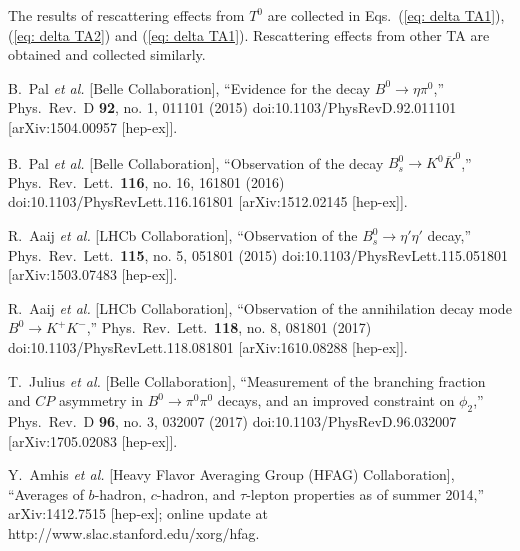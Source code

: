 \documentclass[aps,preprint,floats,epsf,epsfig,nofootinbib,letter]{revtex4}
\begin{document}
The results of rescattering effects from $T^0$ are collected in Eqs.~(\ref{eq: delta TA1}), (\ref{eq: delta TA2}) and (\ref{eq: delta TA1}).
Rescattering effects from other TA are obtained and collected similarly. 


\begin{thebibliography}{99}


  B.~Pal {\it et al.} [Belle Collaboration],
  ``Evidence for the decay $B^{0} \to \eta \pi^0$,''
  Phys.\ Rev.\ D {\bf 92}, no. 1, 011101 (2015)
  doi:10.1103/PhysRevD.92.011101
  [arXiv:1504.00957 [hep-ex]].


  B.~Pal {\it et al.} [Belle Collaboration],
  ``Observation of the decay $B_s^0\rightarrow K^0\overline{K}^0$,''
  Phys.\ Rev.\ Lett.\  {\bf 116}, no. 16, 161801 (2016)
  doi:10.1103/PhysRevLett.116.161801
  [arXiv:1512.02145 [hep-ex]].

  R.~Aaij {\it et al.} [LHCb Collaboration],
  ``Observation of the $B^0_s\to\eta'\eta'$ decay,''
  Phys.\ Rev.\ Lett.\  {\bf 115}, no. 5, 051801 (2015)
  doi:10.1103/PhysRevLett.115.051801
  [arXiv:1503.07483 [hep-ex]].


  R.~Aaij {\it et al.} [LHCb Collaboration],
  ``Observation of the annihilation decay mode $B^{0}\to K^{+}K^{-}$,''
  Phys.\ Rev.\ Lett.\  {\bf 118}, no. 8, 081801 (2017)
  doi:10.1103/PhysRevLett.118.081801
  [arXiv:1610.08288 [hep-ex]].

  T.~Julius {\it et al.} [Belle Collaboration],
  ``Measurement of the branching fraction and $CP$ asymmetry in $B^{0} \to \pi^{0}\pi^{0}$ decays, and an improved constraint on $\phi_{2}$,''
  Phys.\ Rev.\ D {\bf 96}, no. 3, 032007 (2017)
  doi:10.1103/PhysRevD.96.032007
  [arXiv:1705.02083 [hep-ex]].


  Y.~Amhis {\it et al.} [Heavy Flavor Averaging Group (HFAG) Collaboration],
  ``Averages of $b$-hadron, $c$-hadron, and $\tau$-lepton properties as of summer 2014,''
  arXiv:1412.7515 [hep-ex];
  online update at http://www.slac.stanford.edu/xorg/hfag.



\end{thebibliography}
\end{document}
